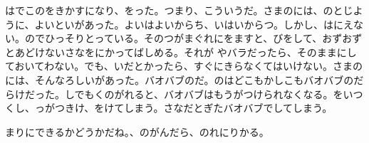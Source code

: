 はでこのをきかすになり、をった。つまり、こういうだ。さまのには、のとじように、よいといがあった。よいはよいからち、いはいからつ。しかし、はにえない。のでひっそりとっている。そのつがまぐれにをますと、びをして、おずおずとあどけないさなをにかってばしめる。それが  やバラだったら、そのままにしておいてわない。でも、いだとかったら、すぐにきらなくてはいけない。さまのには、そんなろしいがあった。バオバブのだ。のはどこもかしこもバオバブのだらけだった。しでもくのがれると、バオバブはもうがつけられなくなる。をいつくし、っがつきけ、をけてしまう。さなだとぎたバオバブでしてしまう。

まりにできるかどうかだね。、のがんだら、のれにりかる。

